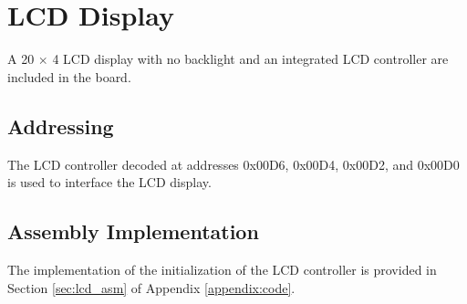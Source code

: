 \newpage
\section{LCD Display}
A 20 $\times$ 4 LCD display with no backlight and an integrated LCD controller are included in the board.

    \subsection{Addressing}
    The LCD controller decoded at addresses 0x00D6, 0x00D4, 0x00D2, and 0x00D0 is used to interface the LCD display.

    \subsection{Assembly Implementation}
    The implementation of the initialization of the LCD controller is provided in Section \ref{sec:lcd_asm} of Appendix \ref{appendix:code}.
